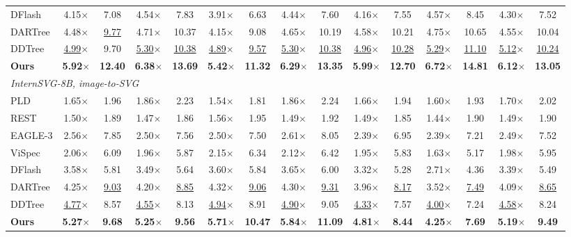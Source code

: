 \begin{table}[t]
\begin{tabular*}{\textwidth}{@{\extracolsep{\fill}}l*{14}{c}@{}}
DFlash & 4.15$\times$ & 7.08 & 4.54$\times$ & 7.83 & 3.91$\times$ & 6.63 & 4.44$\times$ & 7.60 & 4.16$\times$ & 7.55 & 4.57$\times$ & 8.45 & 4.30$\times$ & 7.52 \\
DARTree & 4.48$\times$ & \underline{9.77} & 4.71$\times$ & 10.37 & 4.15$\times$ & 9.08 & 4.65$\times$ & 10.19 & 4.58$\times$ & 10.21 & 4.75$\times$ & 10.65 & 4.55$\times$ & 10.04 \\
DDTree & \underline{4.99}$\times$ & 9.70 & \underline{5.30}$\times$ & \underline{10.38} & \underline{4.89}$\times$ & \underline{9.57} & \underline{5.30}$\times$ & \underline{10.38} & \underline{4.96}$\times$ & \underline{10.28} & \underline{5.29}$\times$ & \underline{11.10} & \underline{5.12}$\times$ & \underline{10.24} \\
\textbf{Ours} & \textbf{5.92}$\times$ & \textbf{12.40} & \textbf{6.38}$\times$ & \textbf{13.69} & \textbf{5.42}$\times$ & \textbf{11.32} & \textbf{6.29}$\times$ & \textbf{13.35} & \textbf{5.99}$\times$ & \textbf{12.70} & \textbf{6.72}$\times$ & \textbf{14.81} & \textbf{6.12}$\times$ & \textbf{13.05} \\
\midrule
\multicolumn{15}{l}{\textit{InternSVG-8B, image-to-SVG}} \\
PLD & 1.65$\times$ & 1.96 & 1.86$\times$ & 2.23 & 1.54$\times$ & 1.81 & 1.86$\times$ & 2.24 & 1.66$\times$ & 1.94 & 1.60$\times$ & 1.93 & 1.70$\times$ & 2.02 \\
REST & 1.50$\times$ & 1.89 & 1.47$\times$ & 1.86 & 1.56$\times$ & 1.95 & 1.49$\times$ & 1.92 & 1.49$\times$ & 1.85 & 1.44$\times$ & 1.90 & 1.49$\times$ & 1.90 \\
EAGLE-3 & 2.56$\times$ & 7.85 & 2.50$\times$ & 7.56 & 2.50$\times$ & 7.50 & 2.61$\times$ & 8.05 & 2.39$\times$ & 6.95 & 2.39$\times$ & 7.21 & 2.49$\times$ & 7.52 \\
ViSpec & 2.06$\times$ & 6.09 & 1.96$\times$ & 5.87 & 2.15$\times$ & 6.34 & 2.12$\times$ & 6.42 & 1.95$\times$ & 5.83 & 1.63$\times$ & 5.17 & 1.98$\times$ & 5.95 \\
DFlash & 3.58$\times$ & 5.81 & 3.49$\times$ & 5.64 & 3.60$\times$ & 5.84 & 3.65$\times$ & 6.00 & 3.32$\times$ & 5.28 & 2.71$\times$ & 4.36 & 3.39$\times$ & 5.49 \\
DARTree & 4.25$\times$ & \underline{9.03} & 4.20$\times$ & \underline{8.85} & 4.32$\times$ & \underline{9.06} & 4.30$\times$ & \underline{9.31} & 3.96$\times$ & \underline{8.17} & 3.52$\times$ & \underline{7.49} & 4.09$\times$ & \underline{8.65} \\
DDTree & \underline{4.77}$\times$ & 8.57 & \underline{4.55}$\times$ & 8.13 & \underline{4.94}$\times$ & 8.91 & \underline{4.90}$\times$ & 9.05 & \underline{4.33}$\times$ & 7.57 & \underline{4.00}$\times$ & 7.24 & \underline{4.58}$\times$ & 8.24 \\
\textbf{Ours} & \textbf{5.27}$\times$ & \textbf{9.68} & \textbf{5.25}$\times$ & \textbf{9.56} & \textbf{5.71}$\times$ & \textbf{10.47} & \textbf{5.84}$\times$ & \textbf{11.09} & \textbf{4.81}$\times$ & \textbf{8.44} & \textbf{4.25}$\times$ & \textbf{7.69} & \textbf{5.19}$\times$ & \textbf{9.49} \\
\bottomrule
\end{tabular*}
\end{table}
